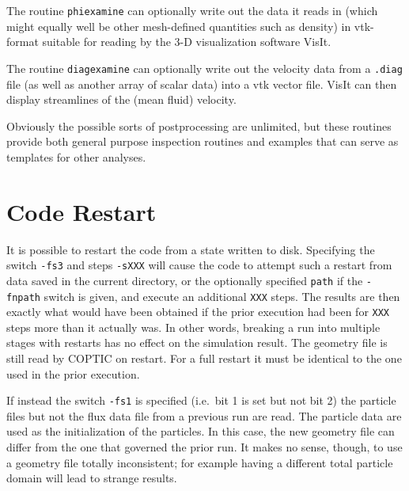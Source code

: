 \documentclass[12pt]{article}
\begin{document}
The routine \verb!phiexamine! can optionally write out the data it
reads in (which might equally well be other mesh-defined quantities
such as density) in vtk-format suitable for reading by the 3-D
visualization software VisIt. 

The routine \verb!diagexamine! can optionally write out the velocity
data from a \verb!.diag! file (as well as another array of scalar
data) into a vtk vector file. VisIt can then display streamlines of
the (mean fluid) velocity.

Obviously the possible sorts of postprocessing are unlimited, but
these routines provide both general purpose inspection routines and
examples that can serve as templates for other analyses.

\section{Code Restart}

It is possible to restart the code from a state written to disk.
Specifying the switch \verb!-fs3! and steps \verb!-sXXX! will cause
the code to attempt such a restart from data saved in the current
directory, or the optionally specified \verb!path!  if the
\verb!-fnpath! switch is given, and execute an additional \verb!XXX!
steps.  The results are then exactly what would have been obtained if
the prior execution had been for \verb!XXX! steps more than it
actually was. In other words, breaking a run into multiple stages with
restarts has no effect on the simulation result. The geometry file is
still read by COPTIC on restart. For a full restart it must be
identical to the one used in the prior execution.


If instead the switch \verb!-fs1! is specified (i.e.\ bit 1 is set but
not bit 2) the particle files but not the flux data file from a previous
run are read. The particle data are used as the initialization of the
particles. In this case, the new geometry file can differ from the one
that governed the prior run. It makes no sense, though, to use a
geometry file totally inconsistent; for example having a different
total particle domain will lead to strange results.
\end{document}
